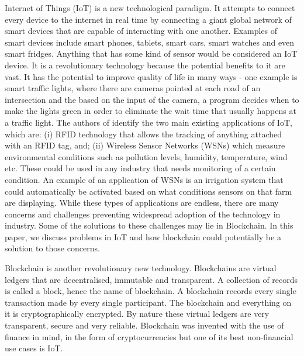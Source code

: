 \documentclass[transmag]{IEEEtran}
\begin{document}
 Internet of Things (IoT) is a new technological paradigm. It attempts to connect every device to the internet in real time by connecting a giant global network of smart devices that are capable of interacting with one another. Examples of smart devices include smart phones, tablets, smart cars, smart watches and even smart fridges. Anything that has some kind of sensor would be considered an IoT device. It is a revolutionary technology because the potential benefits to it are vast. It has the potential to improve quality of life in many ways - one example is smart traffic lights, where there are cameras pointed at each road of an intersection and the based on the input of the camera, a program decides when to make the lights green in order to eliminate the wait time that usually happens at a traffic light. The authors of \cite{ref1} identify the two main existing applications of IoT, which are: (i) RFID technology that allows the tracking of anything attached with an RFID tag, and; (ii) Wireless Sensor Networks (WSNs) which measure environmental conditions such as pollution levels, humidity, temperature, wind etc. These could be used in any industry that needs monitoring of a certain condition. An example of an application of WSNs is an irrigation system that could automatically be activated based on what conditions sensors on that farm are displaying. While these types of applications are endless, there are many concerns and challenges preventing widespread adoption of the technology in industry. Some of the solutions to these challenges may lie in Blockchain. In this paper, we discuss problems in IoT and how blockchain could potentially be a solution to those concerns.
\par Blockchain is another revolutionary new technology. Blockchains are virtual ledgers that are decentralised, immutable and transparent. A collection of records is called a block, hence the name of blockchain. A blockchain records every single transaction made by every single participant. The blockchain and everything on it is cryptographically encrypted. By nature these virtual ledgers are very transparent, secure and very reliable. Blockchain was invented with the use of finance in mind, in the form of cryptocurrencies but one of its best non-financial use cases is IoT.
\end{document}
